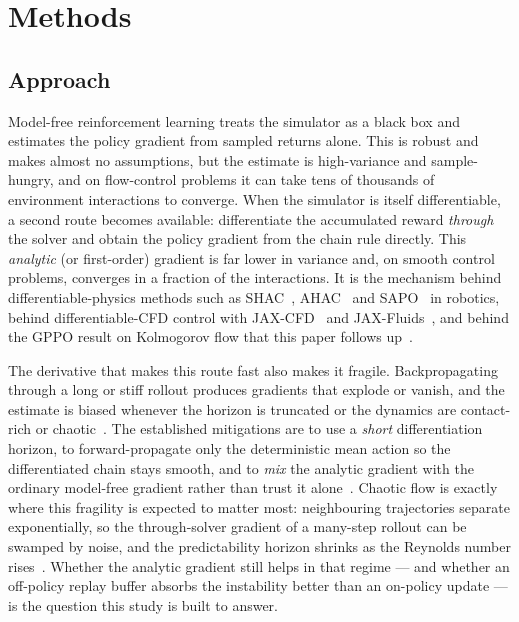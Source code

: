 \section{Methods}
\label{sec:methods}

\subsection{Approach}
\label{sec:approach}

Model-free reinforcement learning treats the simulator as a black box and
estimates the policy gradient from sampled returns alone. This is robust and
makes almost no assumptions, but the estimate is high-variance and
sample-hungry, and on flow-control problems it can take tens of thousands of
environment interactions to converge. When the simulator is itself
differentiable, a second route becomes available: differentiate the
accumulated reward \emph{through} the solver and obtain the policy gradient
from the chain rule directly. This \emph{analytic} (or first-order) gradient
is far lower in variance and, on smooth control problems, converges in a
fraction of the interactions. It is the mechanism behind
differentiable-physics methods such as SHAC~\cite{shac2022},
AHAC~\cite{ahac2024} and SAPO~\cite{sapo2025} in robotics, behind
differentiable-CFD control with JAX-CFD~\cite{jaxcfd2021} and
JAX-Fluids~\cite{jaxfluids2022}, and behind the GPPO result on Kolmogorov
flow that this paper follows up~\cite{hydrogym2026}.

The derivative that makes this route fast also makes it fragile.
Backpropagating through a long or stiff rollout produces gradients that
explode or vanish, and the estimate is biased whenever the horizon is
truncated or the dynamics are contact-rich or
chaotic~\cite{metz2021,suh2022}. The established mitigations are to use a
\emph{short} differentiation horizon, to forward-propagate only the
deterministic mean action so the differentiated chain stays smooth, and to
\emph{mix} the analytic gradient with the ordinary model-free gradient rather
than trust it alone~\cite{shac2022,suh2022,gippo2023}. Chaotic flow is
exactly where this fragility is expected to matter most: neighbouring
trajectories separate exponentially, so the through-solver gradient of a
many-step rollout can be swamped by noise, and the predictability horizon
shrinks as the Reynolds number rises~\cite{metz2021,boffetta2017}. Whether
the analytic gradient still helps in that regime --- and whether an
off-policy replay buffer absorbs the instability better than an on-policy
update --- is the question this study is built to answer.

